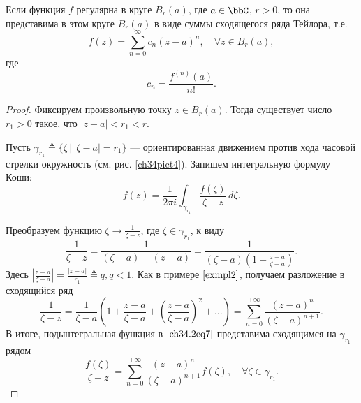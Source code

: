 \begin{thm} \label{abc29}
Если функция $f$ регулярна в круге $B_r(a)$, где $a \in \bbC$, $r > 0$, то она представима в этом круге $B_r(a)$ в виде суммы сходящегося ряда Тейлора, т.е.
\begin{equation} \label{ch34.2eq5}
f(z) = \sum\limits_{n = 0}^{\infty} c_n(z - a)^n, \quad \forall z \in B_r(a),
\end{equation}
где
\begin{equation} \label{ch34.2eq6}
c_n = \frac{f^{(n)}(a)}{n!}.
\end{equation}

\end{thm}
\begin{proof}
Фиксируем произвольную точку $z \in B_r(a)$. Тогда существует число $r_1 > 0$ такое, что $|z - a| < r_1 < r$.

Пусть $\gamma_{r_1} \triangleq \{\zeta \,\big|\, |\zeta - a| = r_1 \}$ — ориентированная движением против хода часовой стрелки окружность (см. рис. \ref{ch34pict4}). Запишем интегральную формулу Коши:
\begin{equation} \label{ch34.2eq7}
f(z) = \frac{1}{2 \pi i} \int_{\gamma_{r_1}} \frac{f(\zeta)}{\zeta - z} \,d\zeta.
\end{equation}

Преобразуем функцию $\zeta \to \frac{1}{\zeta - z}$, где $\zeta \in \gamma_{r_1}$, к виду
$$
\frac{1}{\zeta - z} = \frac{1}{(\zeta - a) - (z - a)} = \frac{1}{(\zeta - a)\left( 1 - \frac{z - a}{\zeta - a}\right)}.
$$
Здесь $\left|\frac{z - a}{\zeta - a} \right| = \frac{|z - a|}{r_1} \triangleq q, q < 1$. Как в примере $\ref{exmpl2}$, получаем разложение в сходящийся ряд
$$
\frac{1}{\zeta - z} = \frac{1}{\zeta - a} \left( 1 + \frac{z - a}{\zeta - a} + \left( \frac{z - a}{\zeta - a}\right)^2 + \ldots \right) = \sum\limits_{n = 0}^{+\infty} \frac{(z - a)^n}{(\zeta - a)^{n + 1}}.
$$
В итоге, подынтегральная функция в $\eqref{ch34.2eq7}$ представима сходящимся на $\gamma_{r_1}$ рядом
\begin{equation} \label{ch34.2eq8}
\frac{f(\zeta)}{\zeta - z} = \sum\limits_{n = 0}^{+\infty} \frac{(z - a)^n}{(\zeta - a)^{n + 1}} f(\zeta), \quad \forall \zeta \in \gamma_{r_1}.
\end{equation}


\end{proof}
